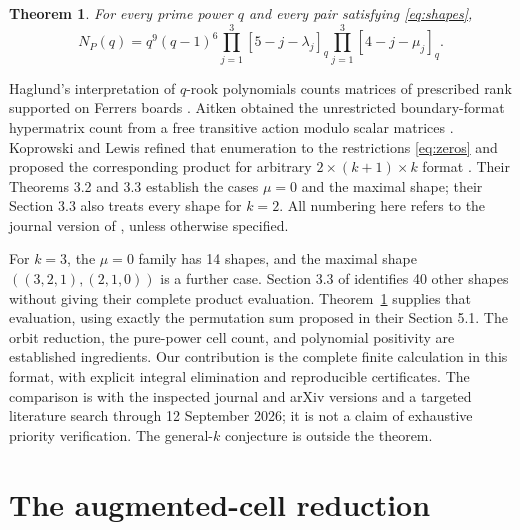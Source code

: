 \documentclass[11pt]{article}
\newtheorem{theorem}{Theorem}
\begin{document}
\begin{theorem}\label{thm:main}
For every prime power $q$ and every pair satisfying \eqref{eq:shapes},
\begin{equation}\label{eq:main}
 N_P(q)=q^9(q-1)^6
 \prod_{j=1}^3[5-j-\lambda_j]_q
 \prod_{j=1}^3[4-j-\mu_j]_q.
\end{equation}
\end{theorem}

Haglund's interpretation of $q$-rook polynomials counts matrices of
prescribed rank supported on Ferrers boards
\cite[Theorem 1 in the preprint]{Haglund}.
Aitken obtained the unrestricted boundary-format hypermatrix count from
a free transitive action modulo scalar matrices \cite{Aitken}.
Koprowski and Lewis refined that enumeration to the restrictions
\eqref{eq:zeros} and proposed the corresponding product for arbitrary
$2\times(k+1)\times k$ format \cite[Conjecture 3.1]{KL}.
Their Theorems 3.2 and 3.3 establish the cases $\mu=0$ and the maximal
shape; their Section 3.3 also treats every shape for $k=2$.
All numbering here refers to the journal version of \cite{KL}, unless
otherwise specified.

For $k=3$, the $\mu=0$ family has 14 shapes, and the maximal shape
$((3,2,1),(2,1,0))$ is a further case. Section 3.3 of \cite{KL}
identifies 40 other shapes without giving their complete product
evaluation. Theorem~\ref{thm:main} supplies that evaluation, using exactly
the permutation sum proposed in their Section 5.1. The orbit reduction,
the pure-power cell count, and polynomial positivity are established
ingredients. Our contribution is the complete finite calculation in this
format, with explicit integral elimination and reproducible certificates.
The comparison is with the inspected journal and arXiv versions and a
targeted literature search through 12 September 2026; it is not a claim of
exhaustive priority verification. The general-$k$ conjecture is outside
the theorem.

\section{The augmented-cell reduction}
\end{document}
